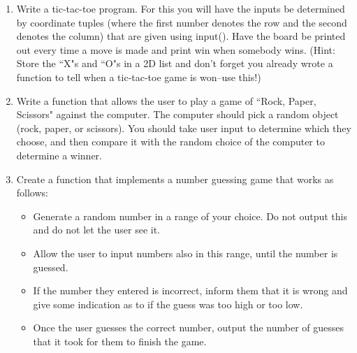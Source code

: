 \documentclass[11pt, letterpaper, onecolumn, oneside, final]{article}
\begin{document}
\begin{enumerate}


\item Write a tic-tac-toe program. For this you will have the inputs be determined by coordinate tuples (where the first number denotes the row and the second denotes the column) that are given using {\consolas input()}. Have the board be printed out every time a move is made and print win when somebody wins. (Hint: Store the \textquotedblleft X"s and \textquotedblleft O"s in a 2D list and don't forget you already wrote a function to tell when a tic-tac-toe game is won--use this!)


\item %
Write a function that allows the user to play a game of \textquotedblleft Rock, Paper, Scissors" against the computer. The computer should pick a random object  (rock, paper, or scissors). You should take user input to determine which they choose, and then compare it with the random choice of the computer to determine a winner. 

\item Create a function that implements a number guessing game that works as follows:
\begin{itemize}
\item Generate a random number in a range of your choice. Do not output this and do not let the user see it.
\item Allow the user to input numbers also in this range, until the number is guessed.
\item If the number they entered is incorrect, inform them that it is wrong and give some indication as to if the guess was too high or too low.
\item Once the user guesses the correct number, output the number of guesses that it took for them to finish the game.
\end{itemize}


\end{enumerate}
\end{document}
